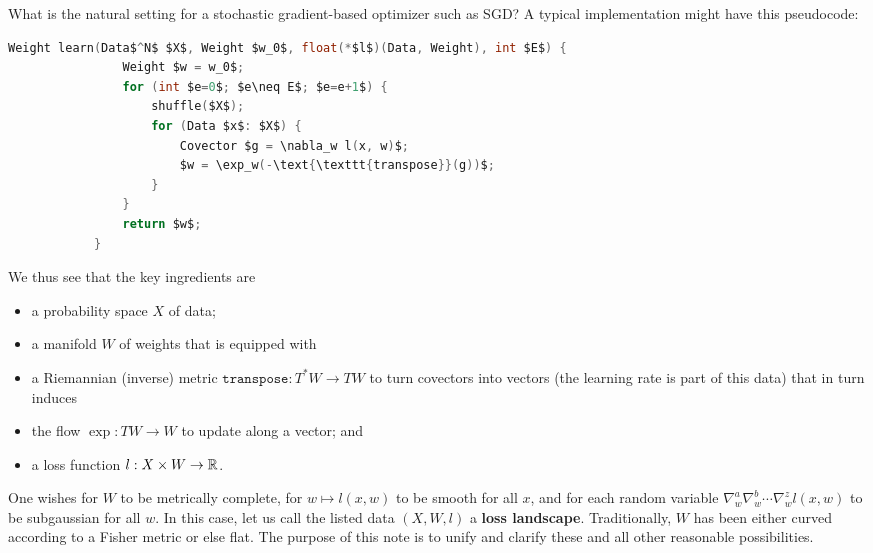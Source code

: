\documentclass[12pt]{article}
\begin{document}

        What is the natural setting for a stochastic gradient-based optimizer such as SGD?
        A typical implementation might have this pseudocode:
        \begin{lstlisting}[language=C,format=C,mathescape=true,basicstyle=\ttfamily\footnotesize]
            Weight learn(Data$^N$ $X$, Weight $w_0$, float(*$l$)(Data, Weight), int $E$) {
                Weight $w = w_0$;
                for (int $e=0$; $e\neq E$; $e=e+1$) {
                    shuffle($X$);
                    for (Data $x$: $X$) {
                        Covector $g = \nabla_w l(x, w)$;
                        $w = \exp_w(-\text{\texttt{transpose}}(g))$; 
                    }
                }
                return $w$;
            }
        \end{lstlisting}
        We thus see that the key ingredients are
        \begin{itemize}\setlength\itemsep{-0.5em}
            \item a probability space $X$ of data;
            \item a manifold $W$ of weights that is equipped with
            \item a Riemannian (inverse) metric $\texttt{transpose}: T^*W\to TW$ to turn covectors into vectors
                    (the learning rate is part of this data) that in turn induces 
            \item the flow $\exp:TW \to W$ to update along a vector; and 
            \item a loss function $l: X\times W \to \mathbb{R}$.
        \end{itemize}
        One wishes for $W$ to be metrically complete, for $w\mapsto l(x, w)$ to be smooth for all $x$,
        and for each random variable $\nabla^a_w \nabla^b_w \cdots \nabla^z_w l(x, w)$ to be subgaussian for all $w$.
        In this case, let us call the listed data $(X, W, l)$ a {\bf loss landscape}. 
        Traditionally, $W$ has been either curved according to a Fisher metric or else flat.
        The purpose of this note is to unify and clarify these and all other reasonable possibilities. 
\end{document}
